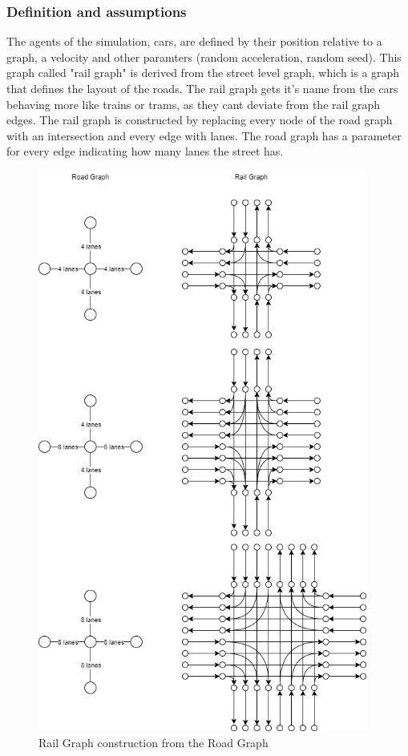 \documentclass[12pt]{article}
\begin{document}
\subsubsection{Definition and assumptions}
The agents of the simulation, cars, are defined by their position relative to a graph, a velocity and other paramters (random acceleration, random seed). This graph called "rail graph" is derived from the street level graph, which is a graph that defines the layout of the roads. The rail graph gets it's name from the cars behaving more like trains or trams, as they cant deviate from the rail graph edges. The rail graph is constructed by replacing every node of the road graph with an intersection and every edge with lanes. The road graph has a parameter for every edge indicating how many lanes the street has.
\begin{figure}[H]
\begin{center}
\includegraphics[height=18.5cm]{railgraph}
\caption{Rail Graph construction from the Road Graph}
\end{center}
\end{figure}
\end{document}
